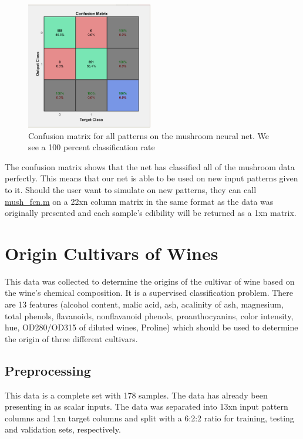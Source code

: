 \documentclass[10pt]{article}
\begin{document}
\begin{center}
\begin{figure}[h]
\centering
\includegraphics[width=0.49\textwidth]{mush_confusion}
\caption{Confusion matrix for all patterns on the mushroom neural net. We see a 100 percent classification rate}
\end{figure}
\end{center}

The confusion matrix shows that the net has classified all of the mushroom data perfectly. This means that our net is able to be used on new input patterns given to it. Should the user want to simulate on new patterns, they can call \url{mush_fcn.m} on a 22xn column matrix in the same format as the data was originally presented and each sample's edibility will be returned as a 1xn matrix.

\newpage
\section{Origin Cultivars of Wines}
This data was collected to determine the origins of the cultivar of wine based on the wine's chemical composition. It is a supervised classification problem. There are 13 features (alcohol content, malic acid, ash, acalinity of ash, magnesium, total phenols, flavanoids, nonflavanoid phenols, proanthocyanins, color intensity, hue, OD280/OD315 of diluted wines, Proline) which should be used to determine the origin of three different cultivars.
\subsection{Preprocessing}
This data is a complete set with 178 samples. The data has already been presenting in as scalar inputs. The data was separated into 13xn input pattern columns and 1xn target columns and split with a 6:2:2 ratio for training, testing and validation sets, respectively.
\end{document}
